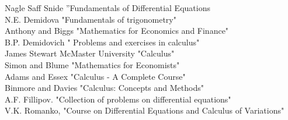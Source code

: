 \documentclass{article}
\begin{document}
\newpage
\begin{thebibliography}{10}

 Nagle Saff Snide ”Fundamentals of Differential Equations \\
 N.E. Demidova "Fundamentals of trigonometry"\\
 Anthony and Biggs "Mathematics for Economics and Finance"\\
 B.P. Demidovich " Problems and exercises in calculus"\\
 James Stewart McMaster University "Calculus"\\
  Simon and Blume "Mathematics for Economists"\\
 Adams and Essex "Calculus - A Complete Course"\\
 Binmore and Davies "Calculus: Concepts and Methods"\\
 A.F. Fillipov. "Collection of problems on differential equations"\\
 V.K. Romanko, "Course on Differential Equations and Calculus of Variations"
\end{thebibliography}
\end{document}
